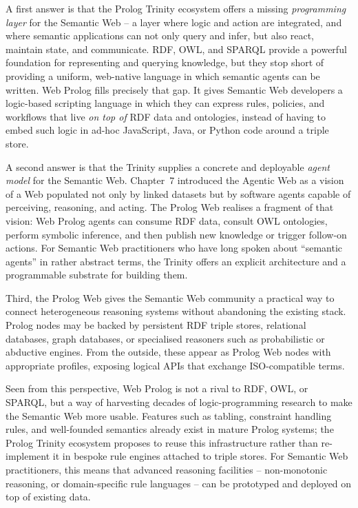 A first answer is that the Prolog Trinity ecosystem offers a missing \emph{programming layer} for the Semantic Web -- a layer where logic and action are integrated, and where semantic applications can not only query and infer, but also react, maintain state, and communicate. RDF, OWL, and SPARQL provide a powerful foundation for representing and querying knowledge, but they stop short of providing a uniform, web-native language in which semantic agents can be written. Web Prolog fills precisely that gap. It gives Semantic Web developers a logic-based scripting language in which they can express rules, policies, and workflows that live \emph{on top of} RDF data and ontologies, instead of having to embed such logic in ad-hoc JavaScript, Java, or Python code around a triple store.

A second answer is that the Trinity supplies a concrete and deployable \emph{agent model} for the Semantic Web. Chapter~7 introduced the Agentic Web as a vision of a Web populated not only by linked datasets but by software agents capable of perceiving, reasoning, and acting. The Prolog Web realises a fragment of that vision: Web Prolog agents can consume RDF data, consult OWL ontologies, perform symbolic inference, and then publish new knowledge or trigger follow-on actions. For Semantic Web practitioners who have long spoken about ``semantic agents'' in rather abstract terms, the Trinity offers an explicit architecture and a programmable substrate for building them.

Third, the Prolog Web gives the Semantic Web community a practical way to connect heterogeneous reasoning systems without abandoning the existing stack. Prolog nodes may be backed by persistent RDF triple stores, relational databases, graph databases, or specialised reasoners such as probabilistic or abductive engines. From the outside, these appear as Prolog Web nodes with appropriate profiles, exposing logical APIs that exchange ISO-compatible terms.

Seen from this perspective, Web Prolog is not a rival to RDF, OWL, or SPARQL, but a way of harvesting decades of logic-programming research to make the Semantic Web more usable. Features such as tabling, constraint handling rules, and well-founded semantics already exist in mature Prolog systems; the Prolog Trinity ecosystem proposes to reuse this infrastructure rather than re-implement it in bespoke rule engines attached to triple stores. For Semantic Web practitioners, this means that advanced reasoning facilities -- non-monotonic reasoning, or domain-specific rule languages -- can be prototyped and deployed on top of existing data.

